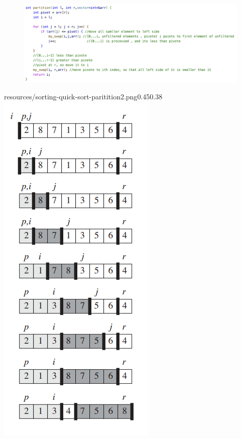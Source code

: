 \begin{figure}
     \includegraphics[width=\dimexpr\textwidth+\marginparwidth]{resources/sorting-quick-sort-2-partition.png}
\end{figure}


\begin{lfigure}{resources/sorting-quick-sort-paritition2.png}{0.45}{0.38}
     \includegraphics[width=\marginparwidth]{resources/sorting-quick-sort-paritition1.png}
\end{lfigure}


